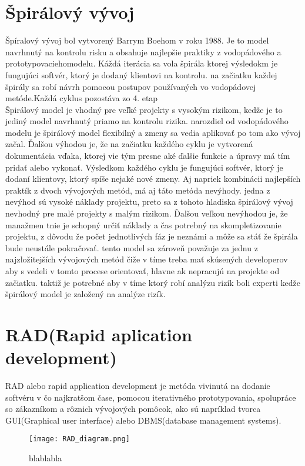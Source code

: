 \documentclass[10pt,oneside,slovak,a4paper]{article}
\begin{document}
\section{Špirálový vývoj}\label{spiral}
Špíralový vývoj bol vytvorený Barrym Boehom v roku 1988. Je to model navrhnutý na kontrolu risku a obsahuje najlepšie praktiky z vodopádového a prototypovaciehomodelu. Káždá iterácia sa vola špirála ktorej výsledokm je fungujúci softvér, ktorý je dodaný klientovi na kontrolu. na začiatku každej špirály sa robí návrh pomocou postupov používaných vo vodopádovej metóde.Každá cyklus pozostáva zo 4. etap\cite{}\\


Špirálový model je vhodný pre veľké projekty s vysokým rizikom, kedže je to jediný model navrhnutý priamo na kontrolu rizika. narozdiel od vodopádového modelu je špirálový model flexibilný a zmeny sa vedia aplikovať po tom ako vývoj začal. Ďalšou výhodou je, že na začiatku každého cyklu je vytvorená dokumentácia vďaka, ktorej vie tým presne aké ďalšie funkcie a úpravy má tím pridať alebo vykonať. Výsledkom každého cyklu je fungujúci softvér, ktorý je dodaní klientovy, ktorý spíše nejaké nové zmeny. Aj napriek kombinácii najlepších praktík z dvoch vývojových metód, má aj táto metóda nevýhody. jedna z nevýhod sú vysoké náklady projektu, preto sa z tohoto hladiska špirálový vývoj nevhodný pre malé projekty s malým rizikom. Ďalšou veľkou nevýhodou je, že manažmen tnie je schopný určiť náklady a čas potrebný na skompletizovanie projektu, z dôvodu že počet jednotlivých fáz je neznámi a môže sa stáť že špirála bude neustále pokračovať. tento model sa zároveň považuje za jednu z najzložitejších  vývojových metód čiže v tíme treba mať skúsených developerov aby s vedeli v tomto procese orientovať, hlavne ak nepracujú na projekte od začiatku. taktiž je potrebné aby v tíme ktorý robí analýzu rizík boli experti kedže špirálový model je založený na analýze rizík.


\section{ RAD(Rapid aplication development)}\label{RAD}
RAD alebo rapid application development je metóda vivinutá na dodanie softvéru v čo najkratšom čase, pomocou iterativného prototypovania, spolupráce so zákazníkom a rôznich vývojových pomôcok, ako sú napríklad tvorca GUI(Graphical user interface) alebo DBMS(database management systems).\cite{}

\begin{figure}[H]
\centering
\texttt{[image: RAD\_diagram.png]}
\caption{blablabla}
\end{figure}
 
\end{document}
